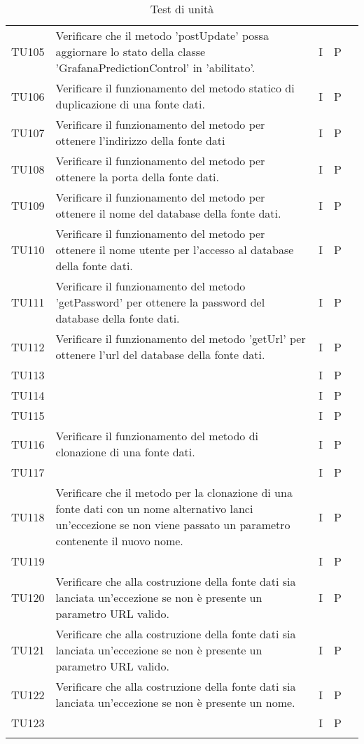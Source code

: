 \begin{longtable} {
		>{}p{15mm} 
		>{}p{79.5mm}
		>{}p{15mm} 
		>{}p{15mm}
		>{}p{0mm}}
	TU105		& Verificare che il metodo 'postUpdate' possa aggiornare lo stato della classe 'GrafanaPredictionControl' in 'abilitato'.& I & P &\TBstrut \\ [2mm]
	TU106		& Verificare il funzionamento del metodo statico di duplicazione di una fonte dati.& I & P &\TBstrut \\ [2mm]
	TU107		& Verificare il funzionamento del metodo per ottenere l'indirizzo della fonte dati& I & P &\TBstrut \\ [2mm]
	TU108		& Verificare il funzionamento del metodo per ottenere la porta della fonte dati.& I & P &\TBstrut \\ [2mm]
	TU109		& Verificare il funzionamento del metodo per ottenere il nome del database della fonte dati.& I & P &\TBstrut \\ [2mm]
	TU110		& Verificare il funzionamento del metodo per ottenere il nome utente per l'accesso al database della fonte dati.& I & P &\TBstrut \\ [2mm]
	TU111		& Verificare il funzionamento del metodo 'getPassword' per ottenere la password del database della fonte dati.& I & P &\TBstrut \\ [2mm]
	TU112		& Verificare il funzionamento del metodo 'getUrl' per ottenere l'url del database della fonte dati.& I & P &\TBstrut \\ [2mm]
	TU113		& & I & P &\TBstrut \\ [2mm]
	TU114		& & I & P &\TBstrut \\ [2mm]
	TU115		& & I & P &\TBstrut \\ [2mm]
	TU116		& Verificare il funzionamento del metodo di clonazione di una fonte dati.& I & P &\TBstrut \\ [2mm]
	TU117		& & I & P &\TBstrut \\ [2mm]
	TU118		& Verificare che il metodo per la clonazione di una fonte dati con un nome alternativo lanci un'eccezione se non viene passato un parametro contenente il nuovo nome.& I & P &\TBstrut \\ [2mm]
	TU119		& & I & P &\TBstrut \\ [2mm]
	TU120		& Verificare che alla costruzione della fonte dati sia lanciata un'eccezione se non è presente un parametro URL valido.& I & P &\TBstrut \\ [2mm]
	TU121		& Verificare che alla costruzione della fonte dati sia lanciata un'eccezione se non è presente un parametro URL valido.& I & P &\TBstrut \\ [2mm]
	TU122		& Verificare che alla costruzione della fonte dati sia lanciata un'eccezione se non è presente un nome.& I & P &\TBstrut \\ [2mm]
	TU123		& & I & P &\TBstrut \\ [2mm]
	
	\rowcolor{white}
	\caption{Test di unità}
\end{longtable}

